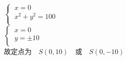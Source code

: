 \documentclass[UTF8]{ctexart}
\begin{document}
\begin{multicols}{2}
\begin{math}
\begin{cases}
                ~x=0\\[1mm]
                ~x^2+y^2=100\\[1mm]
            \end{cases}
        \end{math}\\[5mm]
        \begin{math}
            \begin{cases}
                ~x=0\\[1mm]
                ~y=\pm 10\\[1mm]
            \end{cases}
        \end{math}\\[5mm]
        故定点为~~$S(0,10)$~~或~~$S(0,-10)$
        \newpage
    \end{multicols}

\newpage
\end{document}
